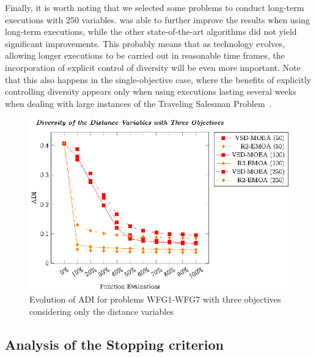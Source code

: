 Finally, it is worth noting that we selected some problems to conduct long-term executions with 250 variables.
%
\VSDMOEA{} was able to further improve the results when using long-term executions, while the other state-of-the-art algorithms did not yield significant improvements.
%
This probably means that as technology evolves, allowing longer executions to be carried out in reasonable time frames,
the incorporation of explicit control of diversity will be even more important.
%
Note that this also happens in the single-objective case, where the benefits of explicitly controlling diversity appears only when using executions lasting
several weeks when dealing with large instances of the Traveling Salesman Problem~\cite{segura2015novel}.
%

\begin{figure}[t]
\centering
\includegraphics[scale=0.85]{Images/Graphic-Diversity_3obj_tikz-figure1.eps}
\caption{Evolution of ADI for problems WFG1-WFG7 with three objectives considering only the distance variables}\label{fig:Diversity_3obj}
\end{figure}

\subsection{Analysis of the Stopping criterion}

